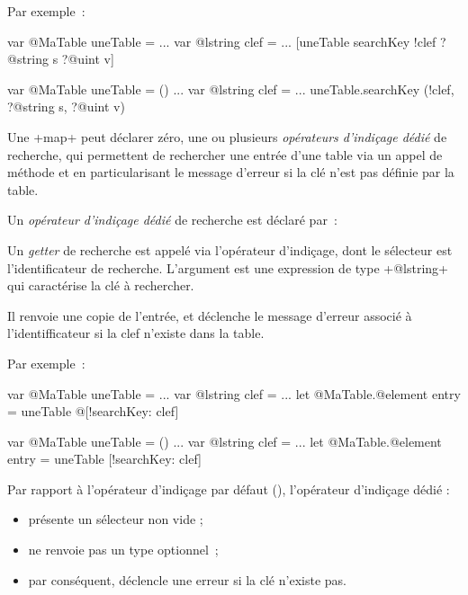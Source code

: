 Par exemple~:

\begin{galgas3}
var @MaTable uneTable = {}
...
var @lstring clef = ...
[uneTable searchKey !clef ?@string s ?@uint v]
\end{galgas3}


\begin{galgas4}
var @MaTable uneTable = ()
...
var @lstring clef = ...
uneTable.searchKey (!clef, ?@string s, ?@uint v)
\end{galgas4}






Une \ggst+map+ peut déclarer zéro, une ou plusieurs \emph{opérateurs d'indiçage dédié} de recherche, qui permettent de rechercher une entrée d'une table via un appel de méthode et en particularisant le message d'erreur si la clé n'est pas définie par la table. 


Un \emph{opérateur d'indiçage dédié} de recherche est déclaré par~:


\begin{galgas3}
\end{galgas3}

\begin{galgas4}
\end{galgas4}



Un \emph{getter} de recherche est appelé via l'opérateur d'indiçage, dont le sélecteur est l'identificateur de recherche. L'argument est une expression de type \ggst+@lstring+ qui caractérise la clé à rechercher.

Il renvoie une copie de l'entrée, et déclenche le message d'erreur associé à l'identifficateur si la clef n'existe dans la table. 


Par exemple~:
\begin{galgas3}
var @MaTable uneTable = {}
...
var @lstring clef = ...
let @MaTable.@element entry = uneTable @[!searchKey: clef]
\end{galgas3}

\begin{galgas4}
var @MaTable uneTable = ()
...
var @lstring clef = ...
let @MaTable.@element entry = uneTable [!searchKey: clef]
\end{galgas4}

Par rapport à l'opérateur d'indiçage par défaut (), l'opérateur d'indiçage dédié :
\begin{itemize}
  \item présente un sélecteur non vide ;
  \item ne renvoie pas un type optionnel~;
  \item par conséquent, déclencle une erreur si la clé n'existe pas.
\end{itemize}




